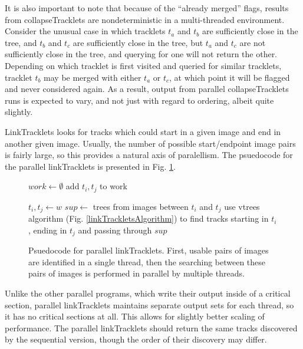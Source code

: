 It is also important to note that because of the ``already merged''
flags, results from collapseTracklets are nondeterministic in a
multi-threaded environment.  Consider the unusual case in which
tracklets $t_a$ and $t_b$ are sufficiently close in the tree, and
$t_b$ and $t_c$ are sufficiently close in the tree, but $t_a$ and
$t_c$ are not sufficiently close in the tree, and querying for one
will not return the other.  Depending on which tracklet is first
visited and queried for similar tracklets, tracklet $t_b$ may be
merged with either $t_a$ or $t_c$, at which point it will be flagged
and never considered again.  As a result, output from parallel
collapseTracklets runs is expected to vary, and not just with regard
to ordering, albeit quite slightly.



LinkTracklets looks for tracks which could start in a given image and
end in another given image.  Usually, the number of possible
start/endpoint image pairs is fairly large, so this provides a natural
axis of paralellism.  The psuedocode for the parallel linkTracklets is presented in Fig. \ref{parallelLinkTracklets}.


\begin{figure}[h!]
\hrulefill
\begin{algorithmic}[5]
\State $work \gets \emptyset$
    \State add $t_i, t_j$ to work
    \EndIf
  \EndFor
\EndFor

  \State $t_i, t_j \gets w$
  \State $sup \gets $ trees from images between $t_i$ and $t_j$
  \State use vtrees algorithm (Fig. \ref{linkTrackletsAlgorithm}) to find tracks starting in $t_i$, ending in $t_j$ and passing through $sup$ 
\EndParFor
\end{algorithmic}
\hrulefill
\caption[Parallel linkTracklets pseudocode.]{Psuedocode for parallel linkTracklets.  First, usable pairs of images are identified in a single thread, then the searching between these pairs of images is performed in parallel by multiple threads.}
\label{parallelLinkTracklets}
\end{figure}

Unlike the other parallel programs, which write their output inside of
a critical section, parallel linkTracklets maintains separate output
sets for each thread, so it has no critical sections at all.  This
allows for slightly better scaling of performance.  The parallel
linkTracklets should return the same tracks discovered by the
sequential version, though the order of their discovery may differ.



